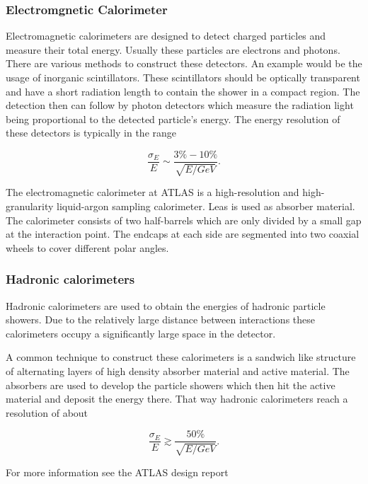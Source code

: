 \subsubsection{Electromgnetic Calorimeter}

Electromagnetic calorimeters are designed to detect charged particles and measure their total energy. Usually these particles are electrons and photons. There are various methods to construct these detectors. An example would be the usage of inorganic scintillators. These scintillators should be optically transparent and have a short radiation length to contain the shower in a compact region. The detection then can follow by photon detectors which measure the radiation light being proportional to the detected particle's energy. The energy resolution of these detectors is typically in the range

\begin{equation}
\frac{\sigma_E}{E} \sim \frac{3 \% - 10 \%}{\sqrt{E/GeV}}.
\end{equation}

The electromagnetic calorimeter at ATLAS is a high-resolution and high-granularity liquid-argon sampling calorimeter. Leas is used as absorber material. The calorimeter consists of two half-barrels which are only divided by a small gap at the interaction point. The endcaps at each side are segmented into two coaxial wheels to cover different polar angles.

\subsubsection{Hadronic calorimeters}

Hadronic calorimeters are used to obtain the energies of hadronic particle showers.
Due to the relatively large distance between interactions these calorimeters occupy a significantly large space in the detector.

A common technique to construct these calorimeters is a sandwich like structure of alternating layers of high density absorber material and active material. 
The absorbers are used to develop the particle showers which then hit the active material and deposit the energy there. That way hadronic calorimeters reach a resolution of about

\begin{equation}
\frac{\sigma_E}{E} \gtrsim \frac{50 \%}{\sqrt{E/GeV}}.
\end{equation}


For more information see the ATLAS design report \cite{atlastdr}


